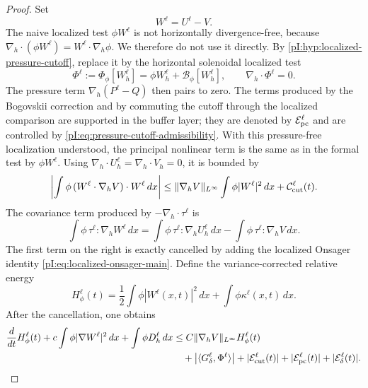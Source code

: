 \documentclass[11pt]{article}
\numberwithin{equation}{section}
\theoremstyle{plain}
\theoremstyle{definition}
\theoremstyle{remark}
\newcommand{\nabh}{\nabla_h}
\newcommand{\divh}{\nabla_h\!\cdot}
\begin{document}
\begin{proof}
Set
\[
        W^\ell=U^\ell-V.
\]
The naive localized test \(\phi W^\ell\) is not horizontally divergence-free, because \(\divh(\phi W^\ell)=W^\ell\cdot\nabh\phi\).  We therefore do not use it directly.  By \cref{pI:hyp:localized-pressure-cutoff}, replace it by the horizontal solenoidal localized test
\[
        \Phi^\ell:=\Phi_\phi[W_h^\ell]
        =\phi W_h^\ell+\mathcal B_\phi[W_h^\ell],
        \qquad \divh\Phi^\ell=0 .
\]
The pressure term \(\nabh(P^\ell-Q)\) then pairs to zero.  The terms produced by the Bogovskii correction and by commuting the cutoff through the localized comparison are supported in the buffer layer; they are denoted by \(\mathcal E_{\rm pc}^\ell\) and are controlled by \eqref{pI:eq:pressure-cutoff-admissibility}.  With this pressure-free localization understood, the principal nonlinear term is the same as in the formal test by \(\phi W^\ell\).  Using \(\divh U_h^\ell=\divh V_h=0\), it is bounded by
\begin{equation}\label{pI:eq:nonlinear-rough-bound}
        \left|
        \int \phi\,(W^\ell\cdot\nabh V)\cdot W^\ell\,dx
        \right|
        \le
        \|\nabh V\|_{L^\infty}\int\phi|W^\ell|^2\,dx
        +\mathcal C_{\rm cut}^\ell(t).
\end{equation}
The covariance term produced by \(-\divh\tau^\ell\) is
\[
        \int \phi\,\tau^\ell:\nabh W^\ell\,dx
        =
        \int \phi\,\tau^\ell:\nabh U_h^\ell\,dx
        -
        \int \phi\,\tau^\ell:\nabh V\,dx .
\]
The first term on the right is exactly cancelled by adding the localized Onsager identity \eqref{pI:eq:localized-onsager-main}.  Define the variance-corrected relative energy
\begin{equation}\label{pI:eq:localized-relative-energy}
        H_\phi^\ell(t)
        =
        \frac12\int\phi|W^\ell(x,t)|^2\,dx
        +\int\phi\kappa^\ell(x,t)\,dx .
\end{equation}
After the cancellation, one obtains
\begin{equation}\label{pI:eq:relative-entropy-differential}
\begin{aligned}
        \frac{d}{dt}H_\phi^\ell(t)
        +c\int\phi|\nabla W^\ell|^2\,dx
        +\int\phi D_h^\ell\,dx
        &\le
        C\|\nabh V\|_{L^\infty}H_\phi^\ell(t)
        \\
        &\quad
        +\left|\langle G_\delta^\ell,\Phi^\ell\rangle\right|
        +|\mathcal E_{\rm cut}^\ell(t)|
        +|\mathcal E_{\rm pc}^\ell(t)|
        +|\mathcal E_\delta^\ell(t)|.
\end{aligned}

\end{equation}
\end{proof}
\end{document}
